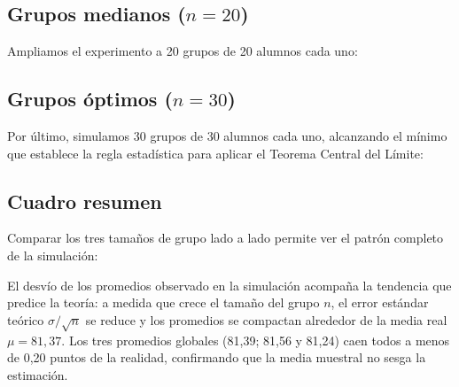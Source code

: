 
\subsection{Grupos medianos ($n = 20$)}
Ampliamos el experimento a 20 grupos de 20 alumnos cada uno:

\TablaDeDatos




\subsection{Grupos óptimos ($n = 30$)}
Por último, simulamos 30 grupos de 30 alumnos cada uno, alcanzando el mínimo que establece la
regla estadística para aplicar el Teorema Central del Límite:

\TablaDeDatos



\subsection{Cuadro resumen}
Comparar los tres tamaños de grupo lado a lado permite ver el patrón completo de la simulación:



El desvío de los promedios observado en la simulación acompaña la tendencia que predice la
teoría: a medida que crece el tamaño del grupo $n$, el error estándar teórico
$\sigma / \sqrt{n}$ se reduce y los promedios se compactan alrededor de la media real
$\mu = 81{,}37$. Los tres promedios globales (81,39; 81,56 y 81,24) caen todos a menos de
0,20 puntos de la realidad, confirmando que la media muestral no sesga la estimación.

